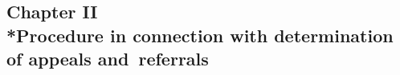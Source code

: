 \documentclass[12pt,a4paper]{article}
\begin{document}
%
%
%

\subsection[Chapter II --- Procedure in connection with determination of appeals and~referrals]{Chapter II\\*Procedure in connection with determination of appeals and~referrals}

\renewcommand\parthead{--- Part~V Chapter II}


%
%
%
\end{document}
